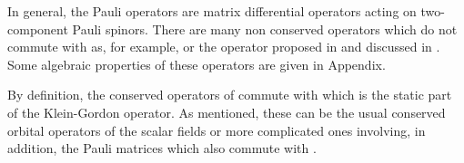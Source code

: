 \documentclass[a4paper,12pt]{article}
\begin{document}
In general, the Pauli operators are \coordHE{} matrix differential 
operators acting on two-component Pauli spinors. There are many 
non conserved operators which do not commute with \myHighlight{$\Delta$}\coordHE{} as, for example, 
\coordHE{} or
the operator \coordHE{} proposed 
in \cite{JMP} and discussed in \cite{HMH}. Some algebraic properties of 
these operators are given in Appendix. 
 
By definition, the conserved operators of \coordHE{} commute with \myHighlight{$\Delta$}\coordHE{} 
which is the static part of the Klein-Gordon operator. As mentioned, these 
can be the usual  conserved  orbital operators of the scalar fields or more 
complicated ones involving, in addition, the  Pauli matrices which 
also commute with \myHighlight{$\Delta$}\coordHE{}.     
\end{document}
